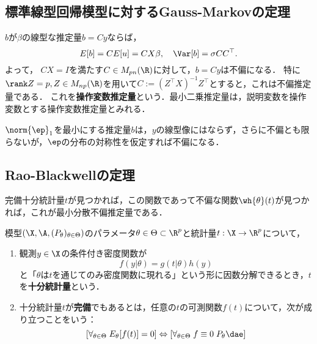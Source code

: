 \documentclass[uplatex,dvipdfmx]{jsreport}
\begin{document}
\subsection{標準線型回帰模型に対するGauss-Markovの定理}

\begin{example}[種々の線型推定量]
    $b$が$\beta$の線型な推定量$b=Cy$ならば，
    \[E[b]=CE[u]=CX\beta,\quad\Var[b]=\sigma CC^\top.\]
    よって，
    $CX=I$を満たす$C\in M_{pn}(\R)$に対して，$b=Cy$は不偏になる．
    特に$\rank Z=p,Z\in M_{np}(\R)$を用いて$C:=(Z^\top X)^{-1}Z^\top$とすると，これは不偏推定量である．
    これを\textbf{操作変数推定量}という．最小二乗推定量は，説明変数を操作変数とする操作変数推定量とみれる．
\end{example}

\begin{example}
    $\norm{\ep}_1$を最小にする推定量$b$は，$y$の線型像にはならず，さらに不偏とも限らないが，$\ep$の分布の対称性を仮定すれば不偏になる．
\end{example}

\subsection{Rao-Blackwellの定理}

\begin{tcolorbox}[colframe=ForestGreen, colback=ForestGreen!10!white,breakable,colbacktitle=ForestGreen!40!white,coltitle=black,fonttitle=\bfseries\sffamily,
title=]
    完備十分統計量$t$が見つかれば，この関数であって不偏な関数$\wh{\theta}(t)$が見つかれば，これが最小分散不偏推定量である．
\end{tcolorbox}

\begin{definition}
    模型$(\X,\A,(P_\theta)_{\theta\in\Theta})$のパラメータ$\theta\in\Theta\subset\R^p$と統計量$t:\X\to\R^p$について，
    \begin{enumerate}
        \item 観測$y\in\X$の条件付き密度関数が
        \[f(y|\theta)=g(t|\theta)h(y)\]
        と「$\theta$は$t$を通じてのみ密度関数に現れる」という形に因数分解できるとき，$t$を\textbf{十分統計量}という．
        \item 十分統計量$t$が\textbf{完備}でもあるとは，任意の$t$の可測関数$f(t)$について，次が成り立つことをいう：
        \[[\forall_{\theta\in\Theta}\;E_\theta[f(t)]=0]\Leftrightarrow[\forall_{\theta\in\Theta}\;f\equiv 0\;P_\theta\dae]\]
    \end{enumerate}
\end{definition}
\end{document}
